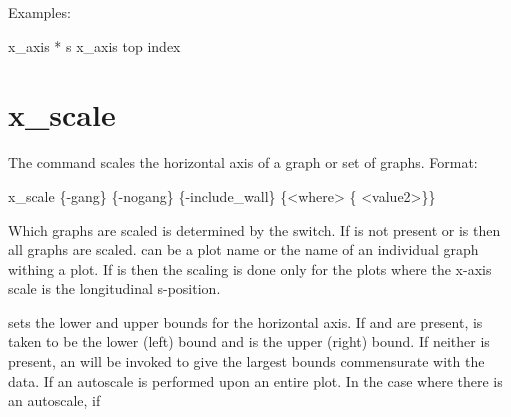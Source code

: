 {{{{{{{{{{Examples:
\begin{example}
  x_axis * s
  x_axis top index
\end{example}

\section{x_scale}
\label{s:x.scale}

The  command scales the horizontal axis of a graph or set of graphs. Format:
\begin{example}
  x_scale \{-gang\} \{-nogang\} \{-include_wall\} \{<where> \{<value1> <value2>\}\}
\end{example}

Which graphs are scaled is determined by the  switch. If  is not present or
 is \vn{*} then all graphs are scaled.  can be a plot name or the name of an
individual graph withing a plot.  If  is  then the scaling is done only for the
plots where the x-axis scale is the longitudinal s-position.

\vskip 7pt 

 sets the lower and upper bounds for the horizontal axis.  If  and
 are present,  is taken to be the lower (left) bound and  is
the upper (right) bound. If neither is present, an  will be invoked to give the
largest bounds commensurate with the data. If an autoscale is performed upon an entire plot. In the
case where there is an autoscale, if \vn{plot%
the chosen scales will be the same for all graphs. That is, a single scale is calculated so that all
the data of all the graphs is within the plot region. The affect of \vn{plot%
be overridden by using the \vn{-gang} or \vn{-nogang} switches.

Note: The \vn{x_scale} command will vary the number of major divisions (set by
plot%
that if two plots have the same range of data but differing major division settings, the
\vn{x_scale} command can produce differing results.

For scaling \vn{floor_plan} plots where there is a building wall to be drawn, if \vn{-include_wall}
is present and autoscaling is being done, then the plot bounds are extended to include the extent of
the building wall.

}}}}}}}}}}}}
